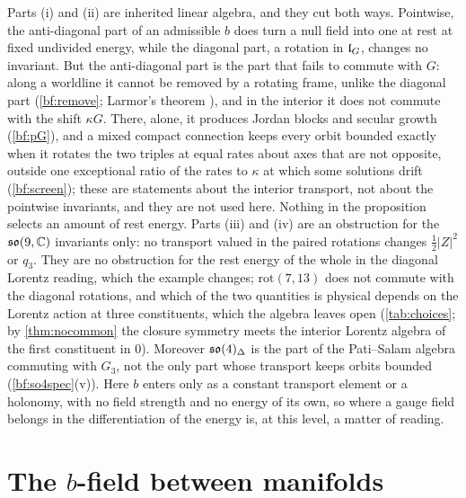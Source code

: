 Parts (i) and (ii) are inherited linear algebra, and they cut both ways. Pointwise, the anti-diagonal part of an admissible $b$ does turn a null
field into one at rest at fixed undivided energy, while the diagonal part, a rotation in $\mathfrak l_G$, changes no invariant. But the anti-diagonal part is
the part that fails to commute with $G$: along a worldline it cannot be removed by a rotating frame, unlike the diagonal part (\cref{bf:remove}; Larmor's theorem
\cite{Larmor1897}), and in the interior it does not commute with the shift $\kappa G$. There, alone, it produces Jordan blocks and secular growth
(\cref{bf:pG}), and a mixed compact connection keeps every orbit bounded exactly when it rotates the two triples at equal rates about axes that
are not opposite, outside one exceptional ratio of the rates to $\kappa$ at which some solutions drift (\cref{bf:screen}); these are statements
about the interior transport, not about the pointwise invariants, and they are not used here. Nothing in the proposition selects an amount of rest energy. Parts (iii) and (iv) are an
obstruction for the $\mathfrak{so}(9,\mathbb{C})$ invariants only: no transport valued in the paired rotations changes $\tfrac12|Z|^2$ or $q_3$. They are no obstruction
for the rest energy of the whole in the diagonal Lorentz reading, which the example changes; $\mathrm{rot}(7,13)$ does not commute with the diagonal
rotations, and which of the two quantities is physical depends on the Lorentz action at three constituents, which the algebra leaves open
(\cref{tab:choices}; by \cref{thm:nocommon} the closure symmetry meets the interior Lorentz algebra of the first constituent in $0$). Moreover
$\mathfrak{so}(4)_\Delta$ is the part of the Pati--Salam algebra commuting with $G_3$, not the only part whose transport keeps orbits bounded (\cref{bf:so4spec}(v)). Here $b$ enters
only as a constant transport element or a holonomy, with no field strength and no energy of its own, so where a gauge field belongs in the
differentiation of the energy is, at this level, a matter of reading.


\section{\texorpdfstring{The $b$-field between manifolds}{The b-field between manifolds}}
\label{d7:sec:main}

